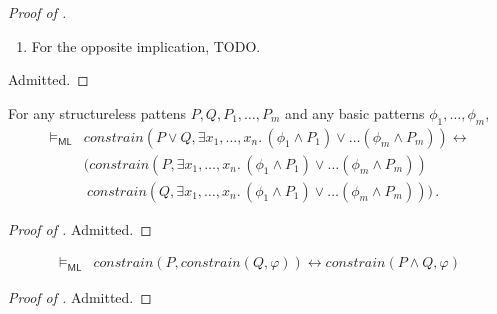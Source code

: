 \documentclass{article}
\newcommand{\ML}{\mathsf{ML}}
\newenvironment{proofenv}
  {
    \VerbatimEnvironment\begin{tcolorbox}[colback=black!0!white] %
  }
  {
   \end{tcolorbox}
  }
\begin{document}
\begin{proof}[Proof of ]
\begin{enumerate}
\begin{proofenv}
    $C \Rightarrow^{*}_{\mathcal{S}^*} C^\prime$
    and $(\mathcal{T}^*, C^\prime, \rho) \vDash \mathit{flatten}(\Psi^\prime)$.
    \end{proofenv}
    We will proceed in five steps:
    \begin{enumerate}
        \item We prove that there exists $c_1,\ldots,c_k$ such that $C = [c_1,\ldots, c_k]$.
        \item We prove that $c_1,\ldots,c_k$ are terminating.
        \item We prove the premise of the assumption (i): that $(\mathcal{T}, c_1, \rho) \vDash \varphi_1 \land P$
        and \ldots and $(\mathcal{T}, c_k, \rho) \vDash \varphi_k \land P$.
        \item From the assumption (i) we get the appropriate $c_1^\prime,\ldots,c_k^\prime$.
        \item We let $C^\prime := [c_1^\prime,\ldots,c_k^\prime]$ and prove that it is reachable from $C$,
        as well as that it satisfies the flattened $\Psi^\prime$.
    \end{enumerate}
    TODO.
    \item For the opposite implication, TODO.
\end{enumerate}

Admitted.
\end{proof}



\begin{lemma}\label{lem:constrain}
  For any structureless pattens $P, Q, P_1, \ldots, P_m$
  and any basic patterns $\phi_1, \ldots, \phi_m$,
    \begin{align*}
        \vDash_\ML & \mathit{constrain}(P \lor Q, \exists x_1,\ldots,x_{n}.\, (\phi_1 \land P_1) \lor \ldots (\phi_m \land P_{m})) \leftrightarrow
        \\ & ( \mathit{constrain}(P, \exists x_1,\ldots,x_{n}.\, (\phi_1 \land P_1) \lor \ldots (\phi_m \land P_{m}))
        \\ & \ \mathit{constrain}(Q, \exists x_1,\ldots,x_{n}.\, (\phi_1 \land P_1) \lor \ldots (\phi_m \land P_{m})) ) \, .
    \end{align*}
\end{lemma}
\begin{proof}[Proof of ]
Admitted.
\end{proof}

\begin{lemma}\label{lem:doubleconstrain}
    \begin{align*}
        \vDash_\ML & \mathit{constrain}(P , \mathit{constrain}(Q, \varphi))
        \leftrightarrow \mathit{constrain}(P \land Q, \varphi)
    \end{align*}
\end{lemma}
\begin{proof}[Proof of ]
Admitted.
\end{proof}
\end{document}
